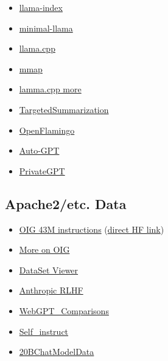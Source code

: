\documentclass{article}
\begin{document}
\begin{itemize}
    \item \href{https://github.com/jerryjliu/llama_index}{llama-index}
    \item \href{https://github.com/zphang/minimal-llama/}{minimal-llama}
    \item \href{https://github.com/ggerganov/llama.cpp}{llama.cpp}
    \item \href{https://justine.lol/mmap/}{mmap}
    \item \href{https://til.simonwillison.net/llms/llama-7b-m2}{lamma.cpp more}
    \item \href{https://github.com/helliun/targetedSummarization}{TargetedSummarization}
    \item \href{https://laion.ai/blog/open-flamingo/}{OpenFlamingo}
    \item \href{https://github.com/Torantulino/Auto-GPT}{Auto-GPT}
    \item \href{https://github.com/imartinez/privateGPT}{PrivateGPT}
\end{itemize}

\subsection*{Apache2/etc. Data}
\begin{itemize}
    \item \href{https://laion.ai/blog/oig-dataset/}{OIG 43M instructions} (\href{https://huggingface.co/datasets/laion/OIG}{direct HF link})
    \item \href{https://laion.ai/blog/oig-dataset/}{More on OIG}
    \item \href{https://huggingface.co/datasets/viewer/?dataset=squad}{DataSet Viewer}
    \item \href{https://huggingface.co/datasets/Anthropic/hh-rlhf}{Anthropic RLHF}
    \item \href{https://huggingface.co/datasets/openai/webgpt_comparisons}{WebGPT\_Comparisons}
    \item \href{https://github.com/yizhongw/self_instruct}{Self\_instruct}
    \item \href{https://github.com/togethercomputer/OpenDataHub}{20BChatModelData}
\end{itemize}
\end{document}
